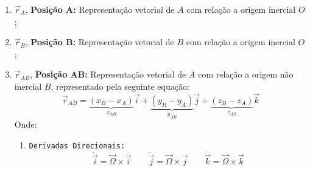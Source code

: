 \documentclass{article}
\begin{document}
                \begin{enumerate}[rightmargin = \leftmargin, noitemsep]
                    \item $\vec{r}_{A}$, \textbf{Posição A:} Representação vetorial de $A$ com relação a origem inercial $O$;

                    \item $\vec{r}_{B}$, \textbf{Posição B:} Representação vetorial de $B$ com relação a origem inercial $O$;

                    \item $\vec{r}_{AB}$, \textbf{Posição AB:} Representação vetorial de $A$ com relação a origem não inercial $B$, representado pela seguinte equação:
                        \begin{equation*}
                            \vec{r}_{AB} = 
                            \underbrace{
                                (x_{B} - x_{A})
                            }_{x_{AB}}\vec{i} + 
                            \underbrace{
                                (y_{B} - y_{A})
                            }_{y_{AB}}\vec{j} + 
                            \underbrace{
                                (z_{B} - z_{A})
                            }_{z_{AB}}\vec{k}
                        \end{equation*}
                    Onde:
                        \begin{enumerate}[rightmargin = \leftmargin]
                            \item \texttt{Derivadas Direcionais:}
                                \begin{equation}
                                    \boxed{
                                        \dot{\vec{i}} = 
                                        \vec{\Omega}\times\vec{i}
                                    }
                                    \qquad
                                    \boxed{
                                        \dot{\vec{j}} = 
                                        \vec{\Omega}\times\vec{j}
                                    }
                                    \qquad
                                    \boxed{
                                        \dot{\vec{k}} = 
                                        \vec{\Omega}\times\vec{k}
                                    }
                                \end{equation}\noindent
                        \end{enumerate}


\end{enumerate}
\end{document}
